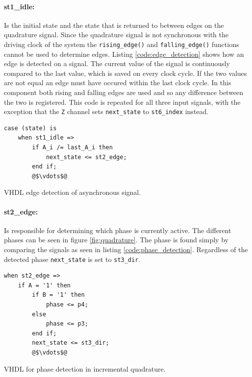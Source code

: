 \paragraph{st1\_idle:} %
Is the initial state and the state that is returned to between edges on the quadrature signal.
Since the quadrature signal is not synchronous with the driving clock of the system the \texttt{rising\_edge()} and \texttt{falling\_edge()} functions cannot be used to determine edges.
Listing \ref{code:edge_detection} shows how an edge is detected on a signal. 
The current value of the signal is continuously compared to the last value, which is saved on every clock cycle.
If the two values are not equal an edge must have occured within the last clock cycle.
In this component both rising and falling edges are used and so any difference between the two is registered.
This code is repeated for all three input signals, with the exception that the \texttt{Z} channel sets \texttt{next\_state} to \texttt{st6\_index} instead.

\begin{listing}[H]
\begin{verbatim}
case (state) is
	when st1_idle =>
		if A_i /= last_A_i then
	        next_state <= st2_edge;
	    end if;
	    @$\vdots$@
\end{verbatim}
\caption{VHDL edge detection of asynchronous signal.}
\label{code:edge_detection}
\end{listing}

\paragraph{st2\_edge:} %
Is responsible for determining which phase is currently active.
The different phases can be seen in figure \ref{fig:quadrature}.
The phase is found simply by comparing the signals as seen in listing \ref{code:phase_detection}.
Regardless of the detected phase \texttt{next\_state} is set to \texttt{st3\_dir}.
\begin{listing}[H]
\begin{verbatim}
when st2_edge =>
	if A = '1' then
	    if B = '1' then
	        phase <= p4;
	    else
	        phase <= p3;
	    end if;
	    next_state <= st3_dir;
	    @$\vdots$@
\end{verbatim}
\caption{VHDL for phase detection in incremental quadrature.}
\label{code:phase_detection}
\end{listing}
